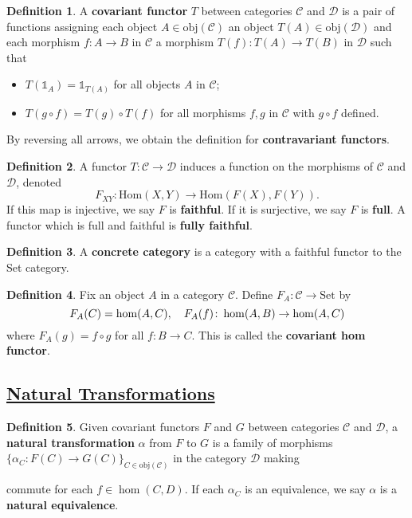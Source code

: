 \documentclass[11pt]{amsart}
\theoremstyle{definition}
\newtheorem*{definition*}{Definition}
\renewcommand\:{\colon}
\newcommand{\calC}{\mathcal{C}}
\newcommand{\calD}{\mathcal{D}}
\newcommand{\1}{\mathds{1}}
\newcommand{\Hom}{\text{Hom}}
\newcommand{\obj}{\text{obj}}
\newcommand{\Set}{\text{Set}}
\begin{document}
\begin{definition*}
	A \textbf{covariant functor} $T$ between categories $\calC$ and $\calD$ is a pair of functions assigning each object $A \in \obj(\calC)$ an object $T(A) \in \obj(\calD)$ and each morphism $f\: A \to B$ in $\calC$ a morphism $T(f) \: T(A) \to T(B)$ in $\calD$ such that
	\begin{itemize}[leftmargin=12.5pt]\setlength\itemsep{0em}
		\item $T(\1_A) = \1_{T(A)}$ for all objects $A$ in $\calC$;
		\item $T(g \circ f) = T(g) \circ T(f)$ for all morphisms $f, g$ in $\calC$ with $g \circ f$ defined.
	\end{itemize}
	By reversing all arrows, we obtain the definition for \textbf{contravariant functors}.
\end{definition*}

\begin{definition*}
	A functor $T\: \calC \to \calD$ induces a function on the morphisms of $\calC$ and $\calD$, denoted \[ F_{XY}\: \Hom(X, Y) \to \Hom(F(X), F(Y)). \] If this map is injective, we say $F$ is \textbf{faithful}. If it is surjective, we say $F$ is \textbf{full}. A functor which is full and faithful is \textbf{fully faithful}.
\end{definition*}

\begin{definition*}
	A \textbf{concrete category} is a category with a faithful functor to the Set category.
\end{definition*}

\begin{definition*}
	Fix an object $A$ in a category $\calC$. Define $F_A\: \calC \to \Set$ by \[ F_A(C) = \hom(A, C), \hskip10pt F_A(f) \: \hom(A, B) \to \hom(A,C) \] where $F_A(g) = f \circ g$ for all $f\: B \to C$. This is called the \textbf{covariant hom functor}.
\end{definition*}

\clearpage %

\subsection*{\underline{Natural Transformations}}

\begin{definition*}
	Given covariant functors $F$ and $G$ between categories $\calC$ and $\calD$, a \textbf{natural transformation} $\alpha$ from $F$ to $G$ is a family of morphisms $\{\alpha_C\: F(C) \to G(C)\}_{C \in \obj(\calC)}$ in the category $\calD$ making
	\begin{center}
	\end{center}
	commute for each $f \in \hom(C, D)$. If each $\alpha_C$ is an equivalence, we say $\alpha$ is a \textbf{natural equivalence}.
\end{definition*}
\vskip20pt
\end{document}
